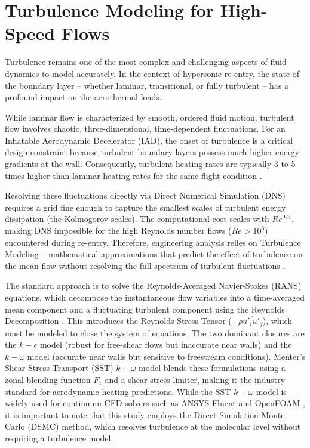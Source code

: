 \section{Turbulence Modeling for High-Speed Flows}
Turbulence remains one of the most complex and challenging aspects of fluid dynamics to model accurately. In the context of hypersonic re-entry, the state of the boundary layer -- whether laminar, transitional, or fully turbulent -- has a profound impact on the aerothermal loads.
\par
While laminar flow is characterized by smooth, ordered fluid motion, turbulent flow involves chaotic, three-dimensional, time-dependent fluctuations. For an Inflatable Aerodynamic Decelerator (IAD), the onset of turbulence is a critical design constraint because turbulent boundary layers possess much higher energy gradients at the wall. Consequently, turbulent heating rates are typically 3 to 5 times higher than laminar heating rates for the same flight condition \cite{AndersonHypersonic}.
\par
Resolving these fluctuations directly via Direct Numerical Simulation (DNS) requires a grid fine enough to capture the smallest scales of turbulent energy dissipation (the Kolmogorov scales). The computational cost scales with $Re^{9/4}$, making DNS impossible for the high Reynolds number flows ($Re > 10^6$) encountered during re-entry. Therefore, engineering analysis relies on Turbulence Modeling -- mathematical approximations that predict the effect of turbulence on the mean flow without resolving the full spectrum of turbulent fluctuations \cite{versteeg2007cfd}.
\par
The standard approach is to solve the Reynolds-Averaged Navier-Stokes (RANS) equations, which decompose the instantaneous flow variables into a time-averaged mean component and a fluctuating turbulent component using the Reynolds Decomposition \cite{versteeg2007cfd}. This introduces the Reynolds Stress Tensor ($-\rho \overline{u'_i u'_j}$), which must be modeled to close the system of equations. The two dominant closures are the $k-\epsilon$ model (robust for free-shear flows but inaccurate near walls) and the $k-\omega$ model (accurate near walls but sensitive to freestream conditions). Menter's Shear Stress Transport (SST) $k-\omega$ model \cite{menter1994SST} blends these formulations using a zonal blending function $F_1$ and a shear stress limiter, making it the industry standard for aerodynamic heating predictions. While the SST $k-\omega$ model is widely used for continuum CFD solvers such as ANSYS Fluent and OpenFOAM \cite{versteeg2007cfd}, it is important to note that this study employs the Direct Simulation Monte Carlo (DSMC) method, which resolves turbulence at the molecular level without requiring a turbulence model.

